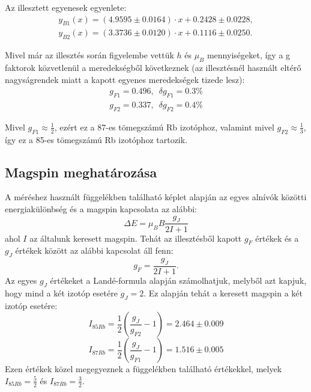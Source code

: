 \documentclass[12pt,a4paper]{article}
\begin{document}
Az illesztett egyenesek egyenlete:
\begin{equation*}
\begin{split}
y_{B1}(x) = (4.9595\pm 0.0164)\cdot x +0.2428 \pm 0.0228,\\
y_{B2}(x) = (3.3736\pm 0.0120)\cdot x +0.1116\pm 0.0250.
\end{split}
\end{equation*}

Mivel már az illesztés során figyelembe vettük $h$ és $\mu_B$ mennyiségeket, így a g faktorok közvetlenül a meredekségből következnek (az illesztésnél használt eltérő nagyságrendek miatt a kapott egyenes meredekségek tizede lesz):
\begin{equation*}
\begin{split}
g_{F1} = 0.496,\enspace \delta g_{F1}=0.3\% \\
g_{F2} = 0.337,\enspace \delta g_{F2}=0.4\%
\end{split}
\end{equation*}

Mivel $g_{F1}\approx \frac{1}{2}$, ezért ez a 87-es tömegszámú Rb izotóphoz, valamint mivel $g_{F2}\approx \frac{1}{3}$, így ez a 85-es tömegszámú Rb izotóphoz tartozik.

\newpage
\subsection{Magspin meghatározása}
\hspace*{10pt} A méréshez használt \cite{3} függelékben található képlet alapján az egyes alnívók közötti energiakülönbség és a magspin kapcsolata az alábbi:
$$\Delta E=\mu_{B}B\frac{g_{J}}{2I+1}$$
ahol $I$ az általunk keresett magspin. Tehát az illesztésből kapott $g_{F}$ értékek és a $g_{J}$ értékek között az alábbi kapcsolat áll fenn:
$$g_{F}=\frac{g_{J}}{2I+1}.$$
Az egyes $g_{J}$ értékeket a Landé-formula alapján számolhatjuk, melyből azt kapjuk, hogy mind a két izotóp esetére $g_{J}=2$. Ez alapján tehát a keresett magspin a két izotóp esetére:
$$I_{85Rb}=\frac{1}{2} \left(\frac{g_{J}}{g_{F2}}-1\right)=2.464 \pm 0.009$$
$$I_{87Rb}=\frac{1}{2} \left(\frac{g_{J}}{g_{F1}}-1\right)=1.516 \pm 0.005$$
Ezen értékek közel megegyeznek a \cite{3} függelékben található értékekkel, melyek $I_{85Rb}=\frac{5}{2}$ és $I_{87Rb}=\frac{3}{2}$.
\end{document}
